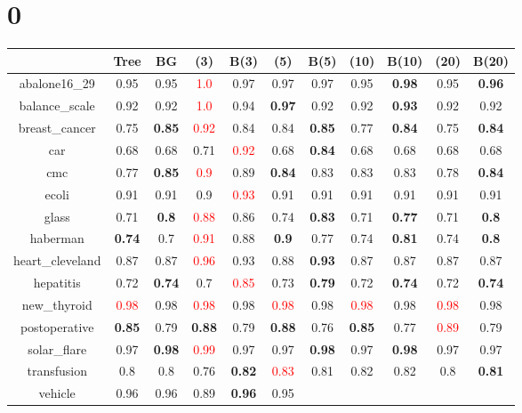 \documentclass{article}%
\begin{document}
%
\normalsize%
\section*{0}%
\begin{tabular}{c|cccccccccc}%
\hline%
&Tree&BG&(3)&B(3)&(5)&B(5)&(10)&B(10)&(20)&B(20)\\%
\hline%
abalone16\_29&0.95&0.95&\textcolor{red}{ 
1.0
}&0.97&0.97&0.97&0.95&\textbf{0.98}&0.95&\textbf{0.96}\\%
\hline%
balance\_scale&0.92&0.92&\textcolor{red}{ 
1.0
}&0.94&\textbf{0.97}&0.92&0.92&\textbf{0.93}&0.92&0.92\\%
\hline%
breast\_cancer&0.75&\textbf{0.85}&\textcolor{red}{ 
0.92
}&0.84&0.84&\textbf{0.85}&0.77&\textbf{0.84}&0.75&\textbf{0.84}\\%
\hline%
car&0.68&0.68&0.71&\textcolor{red}{ 
0.92
}&0.68&\textbf{0.84}&0.68&0.68&0.68&0.68\\%
\hline%
cmc&0.77&\textbf{0.85}&\textcolor{red}{ 
0.9
}&0.89&\textbf{0.84}&0.83&0.83&0.83&0.78&\textbf{0.84}\\%
\hline%
ecoli&0.91&0.91&0.9&\textcolor{red}{ 
0.93
}&0.91&0.91&0.91&0.91&0.91&0.91\\%
\hline%
glass&0.71&\textbf{0.8}&\textcolor{red}{ 
0.88
}&0.86&0.74&\textbf{0.83}&0.71&\textbf{0.77}&0.71&\textbf{0.8}\\%
\hline%
haberman&\textbf{0.74}&0.7&\textcolor{red}{ 
0.91
}&0.88&\textbf{0.9}&0.77&0.74&\textbf{0.81}&0.74&\textbf{0.8}\\%
\hline%
heart\_cleveland&0.87&0.87&\textcolor{red}{ 
0.96
}&0.93&0.88&\textbf{0.93}&0.87&0.87&0.87&0.87\\%
\hline%
hepatitis&0.72&\textbf{0.74}&0.7&\textcolor{red}{ 
0.85
}&0.73&\textbf{0.79}&0.72&\textbf{0.74}&0.72&\textbf{0.74}\\%
\hline%
new\_thyroid&\textcolor{red}{ 
0.98
}&0.98&\textcolor{red}{ 
0.98
}&0.98&\textcolor{red}{ 
0.98
}&0.98&\textcolor{red}{ 
0.98
}&0.98&\textcolor{red}{ 
0.98
}&0.98\\%
\hline%
postoperative&\textbf{0.85}&0.79&\textbf{0.88}&0.79&\textbf{0.88}&0.76&\textbf{0.85}&0.77&\textcolor{red}{ 
0.89
}&0.79\\%
\hline%
solar\_flare&0.97&\textbf{0.98}&\textcolor{red}{ 
0.99
}&0.97&0.97&\textbf{0.98}&0.97&\textbf{0.98}&0.97&0.97\\%
\hline%
transfusion&0.8&0.8&0.76&\textbf{0.82}&\textcolor{red}{ 
0.83
}&0.81&0.82&0.82&0.8&\textbf{0.81}\\%
\hline%
vehicle&0.96&0.96&0.89&\textbf{0.96}&0.95&\textcolor{red}{ 
}
\end{tabular}
\end{document}
